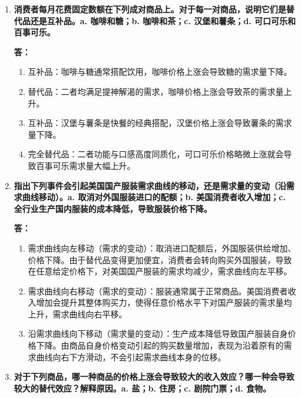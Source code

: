 \begin{enumerate}[label=\textbf{\arabic*.}, leftmargin=*]
		\newpage
		\item \textbf{消费者每月花费固定数额在下列成对商品上。对于每一对商品，说明它们是替代品还是互补品。a. 咖啡和糖；b. 咖啡和茶；c. 汉堡和薯条；d. 可口可乐和百事可乐。}
		
		\textbf{答：}
		\begin{enumerate}[label=\alph*., leftmargin=*]
			\item 互补品：咖啡与糖通常搭配饮用，咖啡价格上涨会导致糖的需求量下降。
			\item 替代品：二者均满足提神解渴的需求，咖啡价格上涨会导致茶的需求量上升。
			\item 互补品：汉堡与薯条是快餐的经典搭配，汉堡价格上涨会导致薯条的需求量下降。
			\item 完全替代品：二者功能与口感高度同质化，可口可乐价格略微上涨就会导致百事可乐需求量大幅上升。
		\end{enumerate}
		
		\item \textbf{指出下列事件会引起美国国产服装需求曲线的移动，还是需求量的变动（沿需求曲线移动）。a. 取消对外国服装进口的配额；b. 美国消费者收入增加；c. 全行业生产国内服装的成本降低，导致服装价格下降。}
		
		\textbf{答：}
		\begin{enumerate}[label=\alph*., leftmargin=*]
			\item 需求曲线向左移动（需求的变动）：取消进口配额后，外国服装供给增加、价格下降。由于替代品变得更加便宜，消费者会转向购买外国服装，导致在任意给定价格下，对美国国产服装的需求均减少，需求曲线向左平移。
			\item 需求曲线向右移动（需求的变动）：服装通常属于正常商品。美国消费者收入增加会提升其整体购买力，使得任意价格水平下对国产服装的需求量均上升，需求曲线向右平移。
			\item 沿需求曲线向下移动（需求量的变动）：生产成本降低导致国产服装自身价格下降。由商品自身价格变动引起的购买数量增加，表现为沿着原有的需求曲线向右下方滑动，不会引起需求曲线本身的位移。
		\end{enumerate}
		
		\item \textbf{对于下列商品，哪一种商品的价格上涨会导致较大的收入效应？哪一种会导致较大的替代效应？解释原因。a. 盐；b. 住房；c. 剧院门票；d. 食物。}
		

\end{enumerate}
